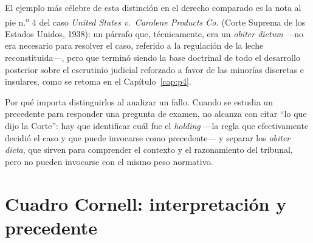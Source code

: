 \documentclass[12pt,oneside]{book}
\begin{document}
\begin{exbox}
El ejemplo más célebre de esta distinción en el derecho comparado es la nota al
pie n.\textsuperscript{o} 4 del caso \textit{United States v.\ Carolene Products
Co.} (Corte Suprema de los Estados Unidos, 1938): un párrafo que, técnicamente, era
un \textit{obiter dictum} —no era necesario para resolver el caso, referido a la
regulación de la leche reconstituida—, pero que terminó siendo la base doctrinal
de todo el desarrollo posterior sobre el escrutinio judicial reforzado a favor de
las minorías discretas e insulares, como se retoma en el Capítulo~\ref{cap:p4}.
\end{exbox}

\begin{impbox}
Por qué importa distinguirlos al analizar un fallo. Cuando se estudia un
precedente para responder una pregunta de examen, no alcanza con citar ``lo que
dijo la Corte'': hay que identificar cuál fue el \textit{holding} —la regla que
efectivamente decidió el caso y que puede invocarse como precedente— y separar los
\textit{obiter dicta}, que sirven para comprender el contexto y el razonamiento del
tribunal, pero no pueden invocarse con el mismo peso normativo.
\end{impbox}

\section{Cuadro Cornell: interpretación y precedente}
\end{document}
